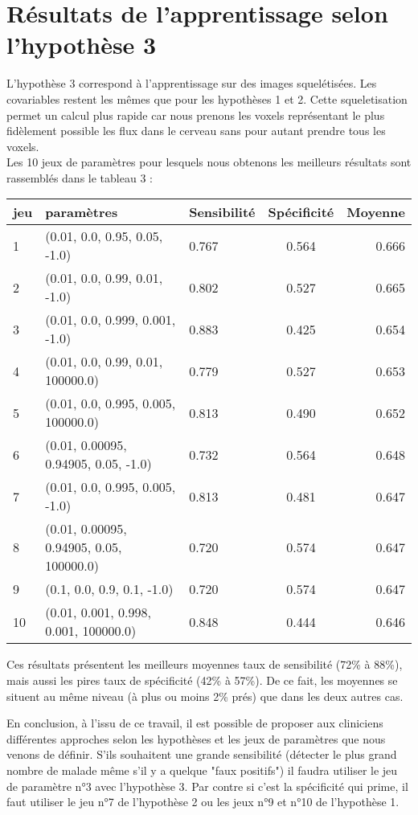 \section{Résultats de l'apprentissage selon l'hypothèse 3}

L'hypothèse 3 correspond à l'apprentissage sur des images squelétisées. Les covariables restent les mêmes que pour les hypothèses 1 et 2. Cette squeletisation permet un calcul plus rapide car nous prenons les voxels représentant le plus fidèlement possible les flux dans le cerveau sans pour autant prendre tous les voxels. 
\\

Les 10  jeux de paramètres pour lesquels nous obtenons les meilleurs résultats sont rassemblés dans le tableau 3 : 

\begin{tabular}{|l|l|l|c|r}
	\hline
	jeu & paramètres & Sensibilité & Spécificité & Moyenne \\
	\hline
	1 & (0.01, 0.0, 0.95, 0.05, -1.0) & 0.767 & 0.564 & 0.666 \\
	2 & (0.01, 0.0, 0.99, 0.01, -1.0) & 0.802 & 0.527 & 0.665 \\
	3 & (0.01, 0.0, 0.999, 0.001, -1.0) & 0.883 & 0.425 & 0.654 \\
	4 & (0.01, 0.0, 0.99, 0.01, 100000.0) & 0.779 & 0.527 & 0.653 \\
	5 & (0.01, 0.0, 0.995, 0.005, 100000.0) & 0.813 & 0.490 & 0.652 \\
	6 & (0.01, 0.00095, 0.94905, 0.05, -1.0) & 0.732 & 0.564 & 0.648 \\
	7 & (0.01, 0.0, 0.995, 0.005, -1.0) & 0.813 & 0.481 & 0.647 \\
	8 & (0.01, 0.00095, 0.94905, 0.05, 100000.0) & 0.720 & 0.574 & 0.647 \\
	9 & (0.1, 0.0, 0.9, 0.1, -1.0) & 0.720 & 0.574 & 0.647 \\
	10 & (0.01, 0.001, 0.998, 0.001, 100000.0) & 0.848 & 0.444 & 0.646 \\
	\hline
	
\end{tabular}

Ces résultats présentent les meilleurs moyennes taux de sensibilité (72\% à 88\%), mais aussi les pires taux de spécificité (42\% à 57\%). De ce fait, les moyennes se situent au même niveau (à plus ou moins 2\% prés) que dans les deux autres cas.

\bigskip

En conclusion, à l'issu de ce travail, il est possible de proposer aux cliniciens différentes approches selon les hypothèses et les jeux de paramètres que nous venons de définir. S'ils souhaitent une grande sensibilité (détecter le plus grand nombre de malade même s'il y a quelque "faux positifs") il faudra utiliser le jeu de paramètre n°3 avec l'hypothèse 3. Par contre si c'est la spécificité qui prime, il faut utiliser le jeu n°7 de l'hypothèse 2 ou les jeux n°9 et n°10 de l'hypothèse 1.